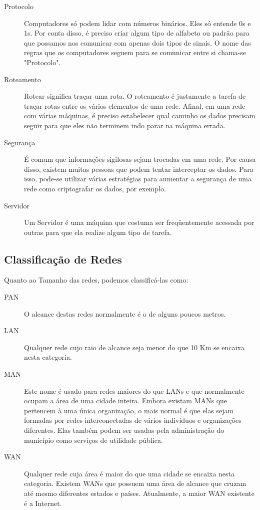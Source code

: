 \begin{description}
		\item[Protocolo] Computadores só podem lidar com números binários. Eles só entende 0s e 1s. Por conta disso, é preciso criar algum tipo de alfabeto ou padrão para que possamos nos comunicar com apenas dois tipos de sinais. O nome das regras que os computadores seguem para se comunicar entre si chama-se "Protocolo".
		\item[Roteamento] Rotear significa traçar uma rota. O roteamento é justamente a tarefa de traçar rotas entre os vários elementos de uma rede. Afinal, em uma rede com várias máquinas, é preciso estabelecer qual caminho os dados precisam seguir para que eles não terminem indo parar na máquina errada.
		\item[Segurança] É comum que informações sigilosas sejam trocadas em uma rede. Por causa disso, existem muitas pessoas que podem tentar interceptar os dados. Para isso, pode-se utilizar várias estratégias para aumentar a segurança de uma rede como criptografar os dados, por exemplo.
		\item[Servidor] Um Servidor é uma máquina que costuma ser freqüentemente acessada por outras para que ela realize algum tipo de tarefa.
	\end{description}

	\subsection{Classificação de Redes}
	Quanto ao Tamanho das redes, podemos classificá-las como:
	\begin{description}
		\item[PAN] O alcance destas redes normalmente é o de alguns poucos metros.
		\item[LAN] Qualquer rede cujo raio de alcance seja menor do que 10 Km se encaixa nesta categoria.
		\item[MAN] Este nome é usado para redes maiores do que LANs e que normalmente ocupam a área de uma cidade inteira. Embora existam MANs que pertencem à uma única organização, o mais normal é que elas sejam formadas por redes interconectadas de vários indivíduos e organizações diferentes. Elas também podem ser usadas pela administração do município como serviços de utilidade pública.
		\item[WAN] Qualquer rede cuja área é maior do que uma cidade se encaixa nesta categoria. Existem WANs que possuem uma área de alcance que cruzam até mesmo diferentes estados e países. Atualmente, a maior WAN existente é a Internet.
	\end{description}

